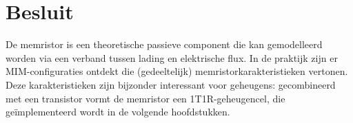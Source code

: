 \section{Besluit}
De memristor is een theoretische passieve component die kan gemodelleerd worden via een verband tussen lading en elektrische flux. In de praktijk zijn er MIM-configuraties ontdekt die (gedeeltelijk) memristorkarakteristieken vertonen. Deze karakteristieken zijn bijzonder interessant voor geheugens: gecombineerd met een transistor vormt de memristor een 1T1R-geheugencel, die geïmplementeerd wordt in de volgende hoofdstukken.
